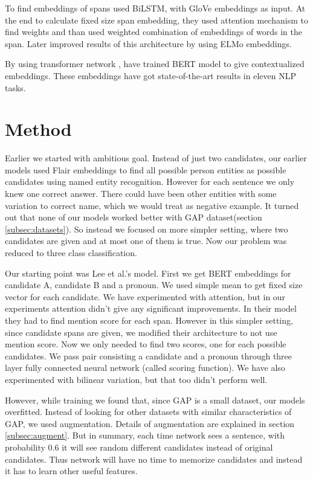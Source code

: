 \documentclass[11pt,a4paper]{article}
\begin{document}
To find embeddings of spans \citet{lee2017end} used BiLSTM, with GloVe \cite{pennington2014glove} embeddings as input. At the end to calculate fixed size span embedding, they used attention mechanism to find weights and than used weighted combination of embeddings of words in the span. Later \citet{Peters:2018} improved results of this architecture by using ELMo embeddings.

By using transformer network \cite{vaswani2017attention}, \citet{devlin2018bert} have trained BERT model to give contextualized embeddings. These embeddings have got state-of-the-art results in eleven NLP tasks.

\section{Method}
\label{sec:method}
Earlier we started with ambitious goal. Instead of just two candidates, our earlier models used Flair embeddings to find all possible person entities as possible candidates using named entity recognition. However for each sentence we only knew one correct answer. There could have been other entities with some variation to correct name, which we would treat as negative example. It turned out that none of our models worked better with GAP dataset(section \ref{subsec:datasets}). So instead we focused on more simpler setting, where two candidates are given and at most one of them is true. Now our problem was reduced to three class classification.

Our starting point was Lee et al.'s model. First we get BERT embeddings for candidate A, candidate B and a pronoun. We used simple mean to get fixed size vector for each candidate. We have experimented with attention, but in our experiments attention didn't give any significant improvements. In their model they had to find mention score for each span. However in this simpler setting, since candidate spans are given, we modified their architecture to not use mention score. Now we only needed to find two scores, one for each possible candidates.  We pass pair consisting a candidate and a pronoun through three layer fully connected neural network (called scoring function).  We have also experimented with bilinear variation, but that too didn't perform well.  

However, while training we found that, since GAP is a small dataset, our models overfitted. Instead of looking for other datasets with similar characteristics of GAP, we used augmentation. Details of augmentation are explained in section \ref{subsec:augment}. But in summary, each time network sees a sentence, with probability 0.6 it will see random different candidates instead of original candidates. Thus network will have no time to memorize candidates and instead it has to learn other useful features.
\end{document}
